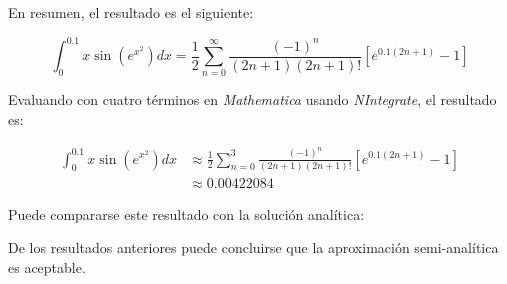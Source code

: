 \begin{ex}
\begin{solution}
	En resumen, el resultado es el siguiente:

	\begin{equation*}
		\int_{0}^{0.1} x \sin(e^{x^2}) dx = \frac{1}{2} \sum_{n = 0}^{\infty} \frac{(-1)^n}{(2n + 1)(2n + 1)!} \left[e^{0.1(2n + 1)} - 1 \right]
	\end{equation*}



	Evaluando con cuatro términos en
	\emph{Mathematica} usando \emph{NIntegrate}, el resultado es:

	\begin{align*}
		\int_{0}^{0.1} x \sin(e^{x^2}) dx &\approx \frac{1}{2} \sum_{n = 0}^{3} \frac{(-1)^n}{(2n + 1)(2n + 1)!} \left[e^{0.1(2n + 1)} - 1 \right]\\
						  &\approx 0.00422084
	\end{align*}

	Puede compararse este resultado con la solución analítica:

	\begin{center}
	\end{center}

	De los resultados anteriores puede concluirse que la aproximación
	semi-analítica es aceptable.
	\end{solution}

\end{ex}

